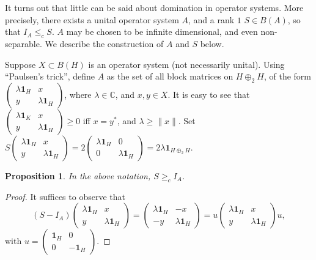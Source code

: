 \documentclass[12pt]{amsart}
\theoremstyle{plain}
\newtheorem{proposition}[theorem]{Proposition}
\theoremstyle{definition}
\renewcommand{\leq}{\leqslant}
\renewcommand{\geq}{\geqslant}\usepackage{amssymb}
\newcommand{\one}{\mathbf{1}}
\newcommand{\C}{\mathbb C}
\begin{document}
It turns out that little can be said about domination in operator systems.
More precisely, there exists a unital operator system $A$, and a rank $1$
$S \in B(A)$, so that $I_A \leq_c S$. $A$ may be chosen to be infinite dimensional,
and even non-separable. We describe the construction of $A$ and $S$ below.

Suppose $X \subset B(H)$ is an operator
system (not necessarily unital). Using ``Paulsen's trick'', define $A$ as the
set of all block matrices on $H \oplus_2 H$, of the form
$\begin{pmatrix} \lambda \one_H & x \\ y & \lambda \one_H \end{pmatrix}$,
where $\lambda \in \C$, and $x, y \in X$. It is easy to see that
$\begin{pmatrix} \lambda \one_K & x \\ y & \lambda \one_H \end{pmatrix} \geq 0$
iff $x = y^*$, and $\lambda \geq \|x\|$. Set
$S \begin{pmatrix} \lambda \one_H & x \\ y & \lambda \one_H \end{pmatrix} =
2 \begin{pmatrix} \lambda \one_H & 0 \\ 0 & \lambda \one_H \end{pmatrix} =
2 \lambda \one_{H \oplus_2 H}$.


\begin{proposition}\label{prop:dom_op_sys}
In the above notation, $S \geq_c I_A$.
\end{proposition}


\begin{proof}
It suffices to observe that
$$
(S - I_A) \begin{pmatrix} \lambda \one_H & x \\ y & \lambda \one_H \end{pmatrix} =
\begin{pmatrix} \lambda \one_H & -x \\ -y & \lambda \one_H \end{pmatrix} =
u \begin{pmatrix} \lambda \one_H & x \\ y & \lambda \one_H \end{pmatrix} u ,
$$
with $u = \begin{pmatrix} \one_H & 0 \\ 0 & -\one_H \end{pmatrix}$.
\end{proof}
\end{document}
